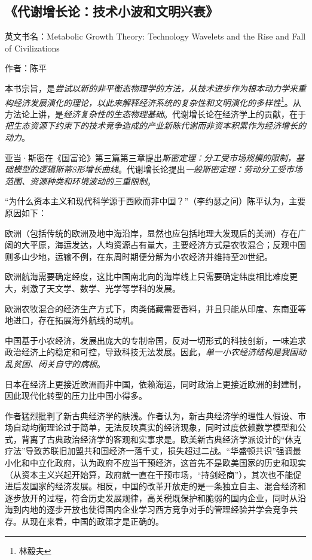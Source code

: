 \subsection{《代谢增长论：技术小波和文明兴衰》}

英文书名：Metabolic Growth Theory: Technology Wavelets and the Rise and Fall of Civilizations

作者：陈平

本书宗旨，是\emph{尝试以新的非平衡态物理学的方法，从技术进步作为根本动力学来重构经济发展演化的理论，以此来解释经济系统的复杂性和文明演化的多样性}\footnote{林毅夫}。从方法论上讲，是\emph{经济复杂性的生态物理基础}。代谢增长论在经济学上的贡献，在于\emph{把生态资源下约束下的技术竞争造成的产业新陈代谢而非资本积累作为经济增长的动力}。

亚当·斯密在《国富论》第三篇第三章提出\emph{斯密定理：分工受市场规模的限制，基础模型的逻辑斯蒂S形增长曲线}。代谢增长论提出\emph{一般斯密定理：劳动分工受市场范围、资源种类和环境波动的三重限制}。

“为什么资本主义和现代科学源于西欧而非中国？”（李约瑟之问）陈平认为，主要原因如下：
\begin{itemize*}
	\item 欧洲（包括传统的欧洲及地中海沿岸，显然也应包括地理大发现后的美洲）存在广阔的大平原，海运发达，人均资源占有量大，主要经济方式是农牧混合；反观中国则多山少地，运输不例，在东周时期便分解为小农经济并维持至20世纪。
	\item  欧洲航海需要确定经度，这比中国南北向的海岸线上只需要确定纬度相比难度更大，刺激了天文学、数学、光学等学科的发展。
	\item 欧洲农牧混合的经济生产方式下，肉类储藏需要香料，并且只能从印度、东南亚等地进口，存在拓展海外航线的动机。
	\item 中国基于小农经济，发展出庞大的专制帝国，反对一切形式的科技创新，一味追求政治经济上的稳定和可控，导致科技无法发展。因此，\emph{单一小农经济结构是我国动乱贫困、闭关自守的病根}。
	\item 日本在经济上更接近欧洲而非中国，依赖海运，同时政治上更接近欧洲的封建制，因此现代化转型的压力比中国小得多。
\end{itemize*}

作者猛烈批判了新古典经济学的肤浅。作者认为，新古典经济学的理性人假设、市场自动均衡理论过于简单，无法反映真实的经济现象，同时过度依赖数学模型和公式，背离了古典政治经济学的客观和实事求是。欧美新古典经济学派设计的“休克疗法”导致苏联旧加盟共和国经济一落千丈，损失超过二战。“华盛顿共识”强调最小化和中立化政府，认为政府不应当干预经济，这首先不是欧美国家的历史和现实（从资本主义兴起开始算，政府就一直在干预市场，“持剑经商”），其次也不能促进后发国家的经济发展。相反，中国的改革开放走的是一条独立自主、混合经济和逐步放开的过程，符合历史发展规律，高关税既保护和脆弱的国内企业，同时从沿海到内地的逐步开放也使得国内企业学习西方竞争对手的管理经验并学会竞争共存。从现在来看，中国的政策才是正确的。

